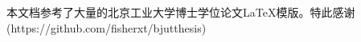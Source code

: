 \begin{acknowledgement}
  本文档参考了大量的北京工业大学博士学位论文\LaTeX 模版。特此感谢(https://github.com/fisherxt/bjutthesis)
\end{acknowledgement}
